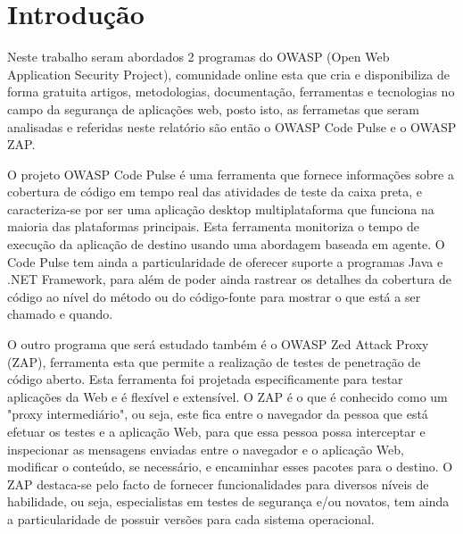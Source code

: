 \section{Introdução}

\par Neste trabalho seram abordados 2 programas do OWASP (Open Web Application Security Project), comunidade online esta que cria e disponibiliza de forma gratuita artigos, metodologias, documentação, ferramentas e tecnologias no campo da segurança de aplicações web, posto isto, as ferrametas que seram analisadas e referidas neste relatório são então o OWASP Code Pulse e o OWASP ZAP.

\par O projeto OWASP Code Pulse é uma ferramenta que fornece informações sobre a cobertura de código em tempo real das atividades de teste da caixa preta, e caracteriza-se por ser uma aplicação desktop multiplataforma que funciona na maioria das plataformas principais. Esta ferramenta monitoriza o tempo de execução da aplicação de destino usando uma abordagem baseada em agente. O Code Pulse tem ainda a particularidade de oferecer suporte a programas Java e .NET Framework, para além de poder ainda rastrear os detalhes da cobertura de código ao nível do método ou do código-fonte para mostrar o que está a ser chamado e quando. 

\par O outro programa que será estudado também é o OWASP Zed Attack Proxy (ZAP), ferramenta esta que permite a realização de testes de penetração de código aberto. Esta ferramenta foi projetada especificamente para testar aplicações da Web e é flexível e extensível. O ZAP é o que é conhecido como um "proxy intermediário", ou seja, este fica entre o navegador da pessoa que está efetuar os testes e a aplicação Web, para que essa pessoa possa interceptar e inspecionar as mensagens enviadas entre o navegador e o aplicação Web, modificar o conteúdo, se necessário, e encaminhar esses pacotes para o destino. O ZAP destaca-se pelo facto de fornecer funcionalidades para diversos níveis de habilidade, ou seja, especialistas em testes de segurança e/ou novatos, tem ainda a particularidade de possuir versões para cada sistema operacional.

